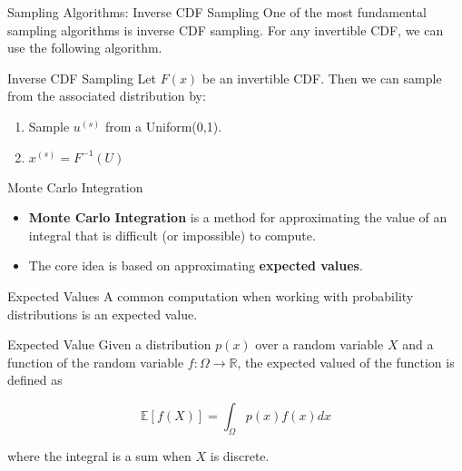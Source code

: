 \documentclass[serif,xcolor=pdftex,dvipsnames,table,hyperref={bookmarks=false,breaklinks}]{beamer}
\begin{document}
\begin{frame}[t]{Sampling Algorithms: Inverse CDF Sampling}
	One of the most fundamental sampling algorithms is inverse CDF sampling. For any invertible CDF, we can use the following algorithm.
	\pause
	\begin{block}{Inverse CDF Sampling}
		Let $F(x)$ be an invertible CDF. Then we can sample from the associated distribution by:
		\begin{enumerate}
			\item Sample $u^{(s)}$ from a Uniform(0,1).
			\item $x^{(s)} = F^{-1}(U)$
		\end{enumerate}
	\end{block}
\end{frame}

%


\begin{frame}[t]{Monte Carlo Integration}
	\begin{itemize}[<+->]
		\item \textbf{Monte Carlo Integration} is a method for approximating the value of an integral that is difficult (or impossible) to compute.
		\item The core idea is based on approximating \textbf{expected values}.
	\end{itemize}
\end{frame}

\begin{frame}[t]{Expected Values}
	A common computation when working with probability distributions is an expected value.
	
	\pause
	\begin{block}{Expected Value}
		Given a distribution $p(x)$ over a random variable $X$ and a function of the random variable $f:\Omega\to \mathbb{R}$, the expected valued of the function is defined as
		
		$$\mathbb{E}[f(X)] = \int_\Omega p(x)f(x)dx$$
		
		where the integral is a sum when $X$ is discrete.
	\end{block}
\end{frame}
\end{document}
